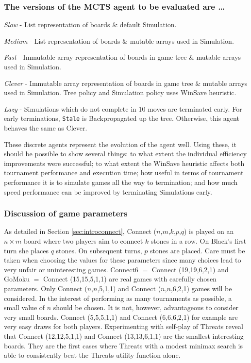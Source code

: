 \subsubsection{The versions of the {MCTS} agent to be evaluated are \ldots}
\begin{list}{}{}
\item \textit{Slow} - List representation of boards \& default Simulation.
\item \textit{Medium} - List representation of boards \& mutable arrays used in Simulation.
\item \textit{Fast} - Immutable array representation of boards in game tree \& mutable arrays used in Simulation.
\item \textit{Clever} - Immutable array representation of boards in game tree \& mutable arrays used in Simulation. Tree policy and Simulation policy uses {WinSave} heuristic.
\item \textit{Lazy} - Simulations which do not complete in 10 moves are terminated early. For early terminations, \texttt{Stale} is {Backpropagated} up the tree. Otherwise, this agent behaves the same as {Clever}.
\end{list}

These discrete agents represent the evolution of the agent well. Using these, it should be possible to show several things: to what extent the individual efficiency improvements were successful; to what extent the {WinSave} heuristic affects both tournament performance and execution time; how useful in terms of tournament performance it is to simulate games all the way to termination; and how much speed performance can be improved by terminating Simulations early.

\subsubsection{Discussion of game parameters}
As detailed in Section \ref{sec:introconnect}, {Connect} ($n$,$m$,$k$,$p$,$q$) is played on an $n \times m$ board where two players aim to connect $k$ stones in a row. On Black's first turn she places $q$ stones. On subsequent turns, $p$ stones are placed.
Care must be taken when choosing the values for these parameters since many choices lead to very unfair or uninteresting games. 
{Connect6} $=$ {Connect} (19,19,6,2,1) and {GoMoku} $=$ {Connect} (15,15,5,1,1) are real games with carefully chosen parameters. Only {Connect} ($n$,$n$,5,1,1) and {Connect} ($n$,$n$,6,2,1) games will be considered. In the interest of performing as many tournaments as possible, a small value of $n$ should be chosen. It is not, however, advantageous to consider very small boards. {Connect} (5,5,5,1,1) and {Connect} (6,6,6,2,1) for example are very easy draws for both players. Experimenting with self-play of {Threats} reveal that {Connect} (12,12,5,1,1) and {Connect} (13,13,6,1,1) are the smallest interesting boards. They are the first cases where {Threats} with a modest {minimax} search is able to consistently beat the {Threats} utility function alone.

